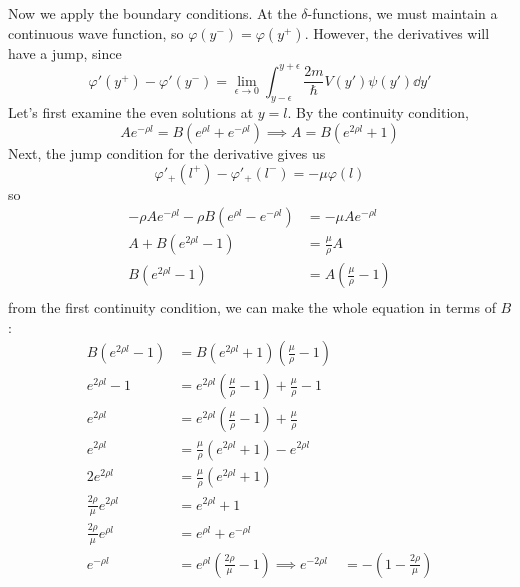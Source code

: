 \documentclass[a4paper,twoside]{article}
\begin{document}
\begin{itemize}
\begin{problem}
        Now we apply the boundary conditions. At the $\delta$-functions, we must maintain a continuous wave function, so $ \varphi(y^-) = \varphi(y^+) $. However, the derivatives will have a jump, since
        \begin{equation}
            \varphi'(y^+) - \varphi'(y^-) = \lim_{\epsilon \to 0} \int_{y-\epsilon}^{y+ \epsilon} \frac{2m}{\hbar} V(y') \psi(y') \dd{y'}
        \end{equation}
        Let's first examine the even solutions at $ y = l $. By the continuity condition,
        \begin{equation}
            Ae^{- \rho l} = B(e^{\rho l} + e^{- \rho l}) \implies A = B(e^{2 \rho l} + 1)
        \end{equation}
        Next, the jump condition for the derivative gives us
        \begin{equation}
            \varphi'_+(l^+)- \varphi'_+(l^-) = - \mu \varphi(l)
        \end{equation}
        so
        \begin{align}
            - \rho A e^{- \rho l} - \rho B(e^{\rho l} - e^{- \rho l}) &= - \mu A e^{- \rho l}\\
            A + B(e^{2 \rho l} - 1) &= \frac{\mu}{\rho} A\\
            B(e^{2 \rho l} - 1) &= A(\frac{\mu}{\rho} - 1)\\
        \end{align}
        from the first continuity condition, we can make the whole equation in terms of $ B $:
        \begin{align}
            B(e^{2 \rho l} - 1) &= B(e^{2 \rho l} + 1)(\frac{\mu}{\rho} -1)\\
            e^{2 \rho l} - 1 &= e^{2 \rho l}(\frac{\mu}{\rho} - 1) + \frac{\mu}{\rho} - 1\\
            e^{2 \rho l} &= e^{2 \rho l} (\frac{\mu}{\rho} - 1) + \frac{\mu}{\rho} \\
            e^{2 \rho l} &= \frac{\mu}{\rho} \left( e^{2 \rho l} + 1 \right) - e^{2 \rho l}\\
            2 e^{2 \rho l} &= \frac{\mu}{\rho} \left( e^{2 \rho l} + 1 \right)\\
            \frac{2 \rho}{\mu} e^{2 \rho l} &= e^{2 \rho l} + 1\\
            \frac{2 \rho}{\mu} e^{\rho l} &= e^{\rho l} + e^{- \rho l}\\
            e^{- \rho l} &= e^{\rho l} \left( \frac{2 \rho}{\mu} - 1 \right)
            \implies e^{- 2 \rho l} &= -\left( 1 - \frac{2 \rho}{\mu} \right)

\end{align}
\end{problem}
\end{itemize}
\end{document}
